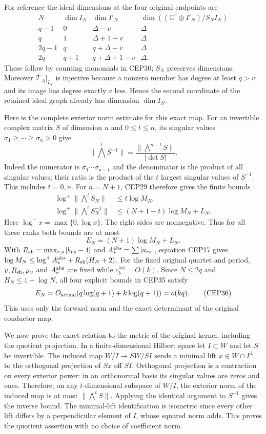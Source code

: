 \documentclass[11pt,a4paper]{article}
\begin{document}
For reference the ideal dimensions at the four original endpoints are
\[
 \begin{array}{c|c|c|c}
 N&\dim I_N&\dim I'_N&
       \dim((\mathbb C^v\oplus I'_N)/S_NI_N)\\ \hline
 q-1&0&\Delta-v&\Delta\\
 q&1&\Delta+1-v&\Delta\\
 2q-1&q&q+\Delta-v&\Delta\\
 2q&q+1&q+\Delta+1-v&\Delta .
 \end{array}\tag{CEP32}
\]
These follow by counting monomials in CEP30; $S_N$ preserves
dimensions. Moreover $\mathcal T_A|_{I_N}$ is injective because
a nonzero member has degree at least $q>v$ and its image has
degree exactly $v$ less. Hence the second coordinate of the
retained ideal graph already has dimension $\dim I_N$.

Here is the complete exterior norm estimate for this exact map.
For an invertible complex matrix $S$ of dimension $n$ and
$0\le t\le n$, its singular values
$\sigma_1\ge\cdots\ge\sigma_n>0$ give
\[
 \|\bigwedge^t S^{-1}\|
 =\frac{\|\bigwedge^{n-t}S\|}{|\det S|}.
 \tag{CEP33}
\]
Indeed the numerator is $\sigma_1\cdots\sigma_{n-t}$ and
the denominator is the product of all singular values; their
ratio is the product of the $t$ largest singular values of
$S^{-1}$. This includes $t=0,n$.
For $n=N+1$, CEP29 therefore gives the finite bounds
\[
 \begin{split}
 \log^+\|\bigwedge^t S_N\|&\le t\log M_N,\\
 \log^+\|\bigwedge^t S_N^{-1}\|
        &\le(N+1-t)\log M_N+L_N .
 \end{split}\tag{CEP34}
\]
Here $\log^+x=\max\{0,\log x\}$. The right sides are nonnegative.
Thus for all these ranks both bounds are at most
\[
 E_N=(N+1)\log M_N+L_N.
 \tag{CEP35}
\]
With $R_{\rm sh}=\max_{r,s}|b_{rs}-4|$ and
$A_*^{\rm abs}=\sum|a_{rs}|$, equation CEP17 gives
$\log M_N\le\log^+A_*^{\rm abs}+R_{\rm sh}(H_N+2)$.
For the fixed original quartet and period, $v,R_{\rm sh},\mu_v$
and $A_*^{\rm abs}$ are fixed while $c_b^{\log}=O(k)$.
Since $N\le2q$ and $H_N\le1+\log N$, all four explicit bounds
in CEP35 satisfy
\[
 E_N=O_{\rm actual}(q\log(q+1)+k\log(q+1))=o(kq).
 \tag{CEP36}
\]
This uses only the forward norm and the exact determinant of
the original conductor map.

We now prove the exact relation to the metric of the original
kernel, including the quotient projection. In a finite-dimensional
Hilbert space let $I\subset W$ and let $S$ be invertible.
The induced map $W/I\longrightarrow SW/SI$ sends a minimal lift
$x\in W\cap I^\perp$ to the orthogonal projection of $Sx$
off $SI$. Orthogonal projection is a contraction on every exterior
power: in an orthonormal basis its singular values are zeros and
ones. Therefore, on any $t$-dimensional subspace of $W/I$, the
exterior norm of the induced map is at most
$\|\bigwedge^t S\|$. Applying the identical argument to $S^{-1}$
gives the inverse bound. The minimal-lift identification is
isometric since every other lift differs by a perpendicular
element of $I$, whose squared norm adds. This proves the
quotient assertion with no choice of coefficient norm.
\end{document}
